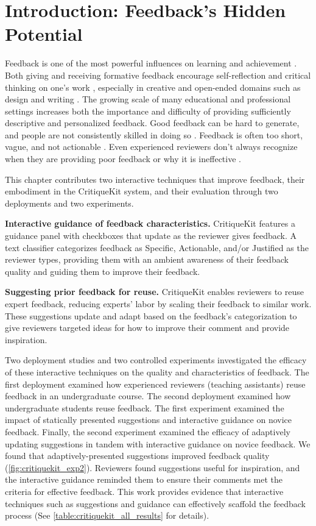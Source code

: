 \section{Introduction: Feedback's Hidden Potential}
Feedback is one of the most powerful influences on learning and achievement \cite{Hattie2007}. Both giving and receiving formative feedback encourage self-reflection and critical thinking on one's work \cite{Li2010, Nicol2006}, especially in creative and open-ended domains such as design and writing \cite{Hattie2007, Sadler1989}. The growing scale of many educational and professional settings increases both the importance and difficulty of providing sufficiently descriptive and personalized feedback. Good feedback can be hard to generate, and people are not consistently skilled in doing so \cite{Kulkarni2013, Yuan2016}. Feedback is often too short, vague, and not actionable \cite{Kulkarni2015, Sommers1982, Xiong2012}. Even experienced reviewers don't always recognize when they are providing poor feedback or why it is ineffective \cite{Sommers1982}.

This chapter contributes two interactive techniques that improve feedback, their embodiment in the CritiqueKit system, and their evaluation through two deployments and two experiments.

\textbf{Interactive guidance of feedback characteristics.} CritiqueKit features a guidance panel with checkboxes that update as the reviewer gives feedback. A text classifier categorizes feedback as Specific, Actionable, and/or Justified as the reviewer types, providing them with an ambient awareness of their feedback quality and guiding them to improve their feedback. 

\textbf{Suggesting prior feedback for reuse.} CritiqueKit enables reviewers to reuse expert feedback, reducing experts' labor by scaling their feedback to similar work. These suggestions update and adapt based on the feedback's categorization to give reviewers targeted ideas for how to improve their comment and provide inspiration. 

Two deployment studies and two controlled experiments investigated the efficacy of these interactive techniques on the quality and characteristics of feedback. The first deployment examined how experienced reviewers (teaching assistants) reuse feedback in an undergraduate course. The second deployment examined how undergraduate students reuse feedback. The first experiment examined the impact of statically presented suggestions and interactive guidance on novice feedback. Finally, the second experiment examined the efficacy of adaptively updating suggestions in tandem with interactive guidance on novice feedback. We found that adaptively-presented suggestions improved feedback quality (\autoref{fig:critiquekit_exp2}). Reviewers found suggestions useful for inspiration, and the interactive guidance reminded them to ensure their comments met the criteria for effective feedback. This work provides evidence that interactive techniques such as suggestions and guidance can effectively scaffold the feedback process (See \autoref{table:critiquekit_all_results} for details).

